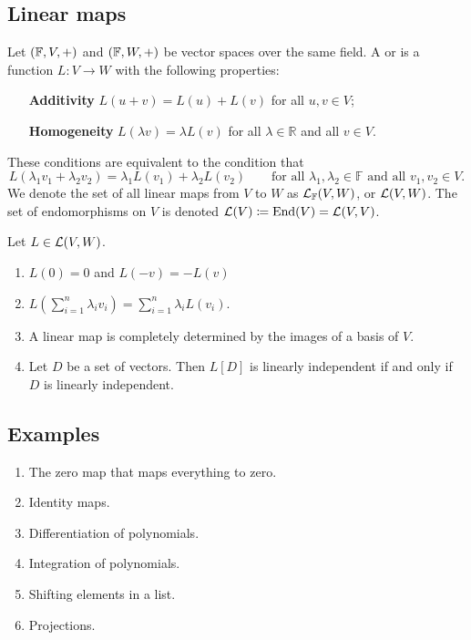 \subsection{Linear maps}
\begin{definition}
Let $(\mathbb{F}, V, +)$ and $(\mathbb{F}, W, +)$ be vector spaces over the same field. A  or  is a function $L:V\to W$ with the following properties:
\begin{itemize}[leftmargin=3cm]
\item[\textbf{Additivity}] $L(u+v) = L(u)+L(v)$ for all $u,v \in V$;
\item[\textbf{Homogeneity}] $L(\lambda v) = \lambda L(v)$ for all $\lambda \in \mathbb{R}$ and all $v\in V$.
\end{itemize}
These conditions are equivalent to the condition that
\[ L(\lambda_1 v_1 + \lambda_2v_2) = \lambda_1L(v_1) + \lambda_2 L(v_2) \qquad \text{for all $\lambda_1,\lambda_2\in \mathbb{F}$ and all $v_1,v_2\in V$.} \]
We denote the set of all linear maps from $V$ to $W$ as $\operatorname{\mathcal{L}}_\mathbb{F}(V,W)$, or $\operatorname{\mathcal{L}}(V,W)$. The set of endomorphisms on $V$ is denoted $\operatorname{\mathcal{L}}(V) \coloneqq \operatorname{End}(V) = \operatorname{\mathcal{L}}(V,V)$.
\end{definition}

\begin{lemma} \label{linearMaps}
Let $L\in \operatorname{\mathcal{L}}(V,W)$.
\begin{enumerate}
\item $L(0) = 0$ and $L(-v) = -L(v)$
\item $L\left(\sum^n_{i=1}\lambda_i v_i\right) = \sum_{i=1}^n\lambda_i L(v_i)$.
\item A linear map is completely determined by the images of a basis of $V$.
\item Let $D$ be a set of vectors. Then $L[D]$ is linearly independent \textup{if and only if} $D$ is linearly independent.
\end{enumerate}
\end{lemma}

\subsection{Examples}
\begin{enumerate}
\item The zero map that maps everything to zero.
\item Identity maps.
\item Differentiation of polynomials.
\item Integration of polynomials.
\item Shifting elements in a list.
\item Projections.
\end{enumerate}

